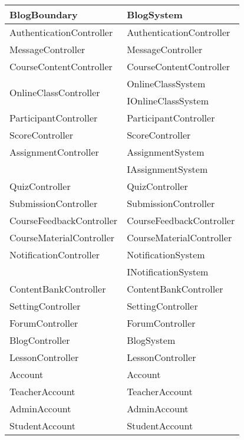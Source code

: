 \documentclass[./../main_file.tex]{subfiles}
\begin{document}
\begin{longtable}{|p{.5\linewidth}|p{.5\linewidth}|}
		BlogBoundary               & BlogSystem               \\ \hline
		AuthenticationController   & AuthenticationController \\ \hline
		MessageController          & MessageController        \\ \hline
		CourseContentController    & CourseContentController  \\ \hline
		\multirow{2}{*}{OnlineClassController}       & OnlineClassSystem                              \\ \cline{2-2} 
		& IOnlineClassSystem       \\ \hline
		ParticipantController      & ParticipantController    \\ \hline
		ScoreController            & ScoreController          \\ \hline
		AssignmentController       & AssignmentSystem         \\ \hline
		& IAssignmentSystem        \\ \hline
		QuizController             & QuizController           \\ \hline
		SubmissionController       & SubmissionController     \\ \hline
		CourseFeedbackController   & CourseFeedbackController \\ \hline
		CourseMaterialController   & CourseMaterialController \\ \hline
		NotificationController     & NotificationSystem       \\ \hline
		& INotificationSystem      \\ \hline
		ContentBankController      & ContentBankController    \\ \hline
		SettingController          & SettingController        \\ \hline
		ForumController            & ForumController          \\ \hline
		BlogController             & BlogSystem               \\ \hline
		LessonController           & LessonController         \\ \hline
		Account                    & Account                  \\ \hline
		TeacherAccount             & TeacherAccount           \\ \hline
		AdminAccount               & AdminAccount             \\ \hline
		StudentAccount             & StudentAccount           \\ \hline

\end{longtable}
\end{document}
